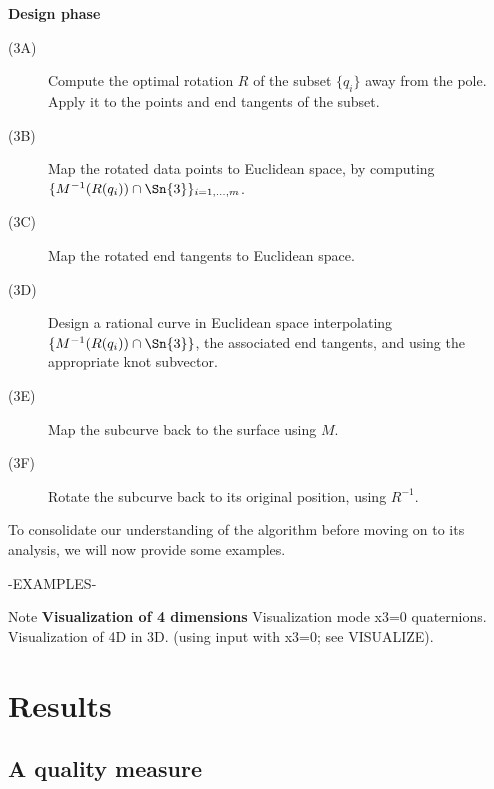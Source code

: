 \centerline{{\bf Design phase}}
\begin{description}
\item[(3A)] Compute the optimal rotation $R$ of the subset $\{q_i\}$
	away from the pole. Apply it to the points and end tangents
	of the subset.
\item[(3B)] Map the rotated data points to Euclidean space, by computing 
	$\{M^{-1}(R(q_i)) \cap \Sn{3}\}_{i=1,\ldots,m}$.
\item[(3C)] Map the rotated end tangents to Euclidean space.
\item[(3D)] Design a rational curve in Euclidean space
	interpolating $\{M^{-1}(R(q_i)) \cap \Sn{3}\}$, the
	associated end tangents, and using the appropriate knot subvector.
\item[(3E)] Map the subcurve back to the surface using $M$.
\item[(3F)] Rotate the subcurve back to its original position, using $R^{-1}$.
\end{description}

To consolidate our understanding of the algorithm before moving on to its
analysis, we will now provide some examples.

-EXAMPLES-

Note {\bf Visualization of 4 dimensions}
Visualization mode x3=0 quaternions.  Visualization of 4D in 3D.  
(using input with x3=0; see VISUALIZE).

\section{Results}
\label{sec:results}

\subsection{A quality measure}
\label{sec:cov}

